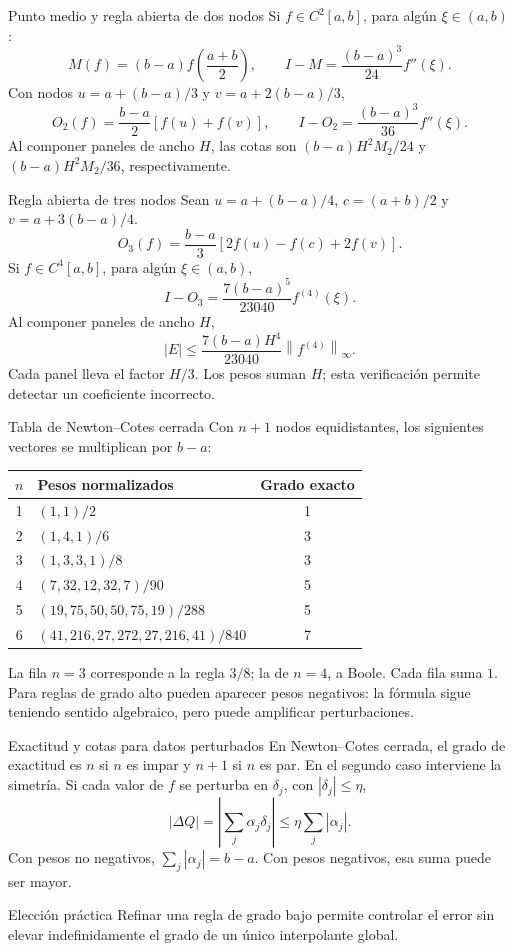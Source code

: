 \documentclass[aspectratio=169,12pt]{beamer}
\newcommand{\norm}[1]{\left\lVert#1\right\rVert}
\begin{document}
\begin{frame}{Punto medio y regla abierta de dos nodos}
Si $f\in C^2[a,b]$, para algún $\xi\in(a,b)$:
\[M(f)=(b-a)f\left(\frac{a+b}2\right),\qquad
I-M=\frac{(b-a)^3}{24}f''(\xi).\]
Con nodos $u=a+(b-a)/3$ y $v=a+2(b-a)/3$,
\[O_2(f)=\frac{b-a}{2}[f(u)+f(v)],\qquad
I-O_2=\frac{(b-a)^3}{36}f''(\xi).\]
Al componer paneles de ancho $H$, las cotas son
$(b-a)H^2M_2/24$ y $(b-a)H^2M_2/36$, respectivamente.
\end{frame}

\begin{frame}{Regla abierta de tres nodos}
Sean $u=a+(b-a)/4$, $c=(a+b)/2$ y $v=a+3(b-a)/4$.
\[O_3(f)=\frac{b-a}{3}[2f(u)-f(c)+2f(v)].\]
Si $f\in C^4[a,b]$, para algún $\xi\in(a,b)$,
\[I-O_3=\frac{7(b-a)^5}{23040}f^{(4)}(\xi).\]
Al componer paneles de ancho $H$,
\[|E|\leq\frac{7(b-a)H^4}{23040}\norm{f^{(4)}}_\infty.\]
Cada panel lleva el factor $H/3$. Los pesos suman $H$; esta verificación
permite detectar un coeficiente incorrecto.
\end{frame}

\begin{frame}{Tabla de Newton--Cotes cerrada}
\small
Con $n+1$ nodos equidistantes, los siguientes vectores se multiplican por $b-a$:
\begin{center}\begin{tabular}{clc}\toprule
$n$&Pesos normalizados&Grado exacto\\\midrule
1&$(1,1)/2$&1\\
2&$(1,4,1)/6$&3\\
3&$(1,3,3,1)/8$&3\\
4&$(7,32,12,32,7)/90$&5\\
5&$(19,75,50,50,75,19)/288$&5\\
6&$(41,216,27,272,27,216,41)/840$&7\\\bottomrule
\end{tabular}\end{center}
La fila $n=3$ corresponde a la regla $3/8$; la de $n=4$, a Boole.
Cada fila suma $1$. Para reglas de grado alto pueden aparecer pesos negativos:
la fórmula sigue teniendo sentido algebraico, pero puede amplificar perturbaciones.
\end{frame}

\begin{frame}{Exactitud y cotas para datos perturbados}
En Newton--Cotes cerrada, el grado de exactitud es $n$ si $n$ es impar
y $n+1$ si $n$ es par. En el segundo caso interviene la simetría.
Si cada valor de $f$ se perturba en $\delta_j$, con $|\delta_j|\leq\eta$,
\[|\Delta Q|=\left|\sum_j\alpha_j\delta_j\right|
\leq\eta\sum_j|\alpha_j|.\]
Con pesos no negativos, $\sum_j|\alpha_j|=b-a$.
Con pesos negativos, esa suma puede ser mayor.
\begin{block}{Elección práctica}
Refinar una regla de grado bajo permite controlar el error sin elevar
indefinidamente el grado de un único interpolante global.
\end{block}
\end{frame}
\end{document}
